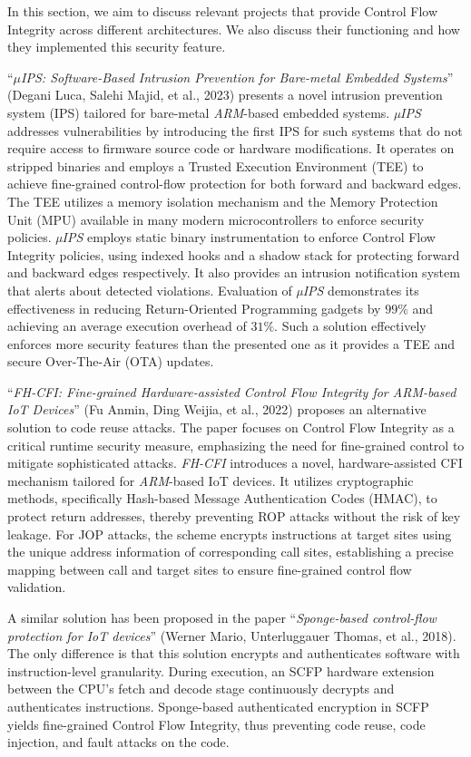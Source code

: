 In this section, we aim to discuss relevant projects that provide Control Flow Integrity
across different architectures. We also discuss their functioning and how they
implemented this security feature.

``\textit{$\mu$IPS: Software-Based Intrusion Prevention for Bare-metal Embedded
Systems}'' (Degani Luca, Salehi Majid, et al., 2023)\cite{Degani} presents a
novel intrusion prevention system (IPS) tailored for bare-metal \textit{ARM}-based
embedded systems. \textit{µIPS} addresses vulnerabilities by introducing the first
IPS for such systems that do not require access to firmware source code or hardware
modifications. It operates on stripped binaries and employs a Trusted Execution
Environment (TEE) to achieve fine-grained control-flow protection for both
forward and backward edges. The TEE utilizes a memory isolation mechanism and the
Memory Protection Unit (MPU) available in many modern microcontrollers to enforce
security policies. \textit{µIPS} employs static binary instrumentation to enforce
Control Flow Integrity policies, using indexed hooks and a shadow stack for
protecting forward and backward edges respectively. It also provides an intrusion
notification system that alerts about detected violations. Evaluation of \textit{µIPS}
demonstrates its effectiveness in reducing Return-Oriented Programming gadgets by
$99\%$ and achieving an average execution overhead of $31\%$. Such a solution
effectively enforces more security features than the presented one as it
provides a TEE and secure Over-The-Air (OTA) updates.

``\textit{FH-CFI: Fine-grained Hardware-assisted Control Flow Integrity for ARM-based
IoT Devices}'' (Fu Anmin, Ding Weijia, et al., 2022)\cite{fhcfi} proposes an
alternative solution to code reuse attacks. The paper focuses on Control Flow Integrity
as a critical runtime security measure, emphasizing the need for fine-grained
control to mitigate sophisticated attacks. \textit{FH-CFI} introduces a novel, hardware-assisted
CFI mechanism tailored for \textit{ARM}-based IoT devices. It utilizes cryptographic
methods, specifically Hash-based Message Authentication Codes (HMAC), to protect
return addresses, thereby preventing ROP attacks without the risk of key leakage.
For JOP attacks, the scheme encrypts instructions at target sites using the
unique address information of corresponding call sites, establishing a precise mapping
between call and target sites to ensure fine-grained control flow validation.

A similar solution has been proposed in the paper ``\textit{Sponge-based control-flow
protection for IoT devices}'' (Werner Mario, Unterluggauer Thomas, et al., 2018)\cite{Sponge}.
The only difference is that this solution encrypts and authenticates software
with instruction-level granularity. During execution, an SCFP hardware extension
between the CPU's fetch and decode stage continuously decrypts and authenticates
instructions. Sponge-based authenticated encryption in SCFP yields ﬁne-grained Control
Flow Integrity, thus preventing code reuse, code injection, and fault attacks on
the code.

